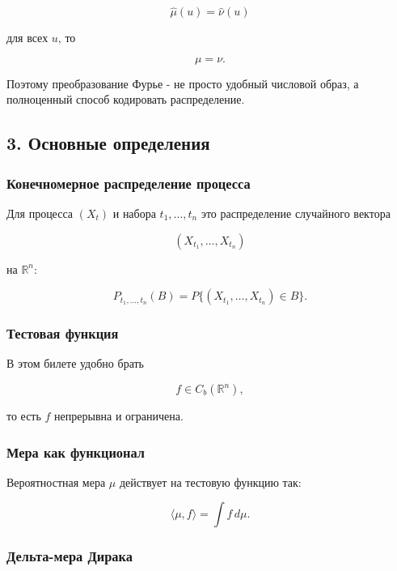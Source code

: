 \documentclass[
  11pt,
  a4paper,
]{article}
\begin{document}
\[
\widehat\mu(u)=\widehat\nu(u)
\]

для всех \(u\), то

\[
\mu=\nu.
\]

Поэтому преобразование Фурье - не просто удобный числовой образ, а
полноценный способ кодировать распределение.

\subsection{3. Основные
определения}\label{ux43eux441ux43dux43eux432ux43dux44bux435-ux43eux43fux440ux435ux434ux435ux43bux435ux43dux438ux44f}

\subsubsection{Конечномерное распределение
процесса}\label{ux43aux43eux43dux435ux447ux43dux43eux43cux435ux440ux43dux43eux435-ux440ux430ux441ux43fux440ux435ux434ux435ux43bux435ux43dux438ux435-ux43fux440ux43eux446ux435ux441ux441ux430}

Для процесса \((X_t)\) и набора \(t_1,\ldots,t_n\) это распределение
случайного вектора

\[
(X_{t_1},\ldots,X_{t_n})
\]

на \(\mathbb R^n\):

\[
P_{t_1,\ldots,t_n}(B)
=
P\{(X_{t_1},\ldots,X_{t_n})\in B\}.
\]

\subsubsection{Тестовая
функция}\label{ux442ux435ux441ux442ux43eux432ux430ux44f-ux444ux443ux43dux43aux446ux438ux44f}

В этом билете удобно брать

\[
f\in C_b(\mathbb R^n),
\]

то есть \(f\) непрерывна и ограничена.

\subsubsection{Мера как
функционал}\label{ux43cux435ux440ux430-ux43aux430ux43a-ux444ux443ux43dux43aux446ux438ux43eux43dux430ux43b}

Вероятностная мера \(\mu\) действует на тестовую функцию так:

\[
\langle\mu,f\rangle=\int f\,d\mu.
\]

\subsubsection{Дельта-мера
Дирака}\label{ux434ux435ux43bux44cux442ux430-ux43cux435ux440ux430-ux434ux438ux440ux430ux43aux430}
\end{document}
